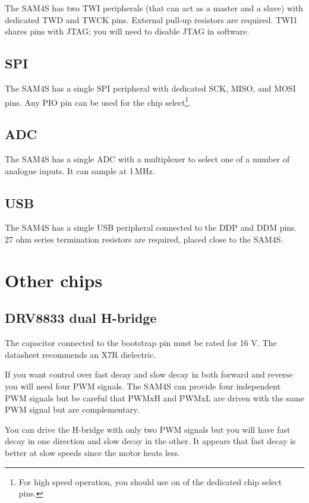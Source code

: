 The SAM4S has two TWI peripherals (that can act as a master and
a slave) with dedicated TWD and TWCK pins. External pull-up resistors
are required.  TWI1 shares pins with JTAG; you will need to disable
JTAG in software.

\subsection{SPI}\label{spi}

The SAM4S has a single SPI peripheral with dedicated SCK, MISO,
and MOSI pins. Any PIO pin can be used for the chip
select\footnote{For high speed operation, you should use on of the
  dedicated chip select pins.}.

\subsection{ADC}\label{adc}

The SAM4S has a single ADC with a multiplexer to select one of a
number of analogue inputs.  It can sample at 1\,MHz.

\subsection{USB}\label{usb}

The SAM4S has a single USB peripheral connected to the DDP and DDM
pins. 27 ohm series termination resistors are required, placed close to
the SAM4S.

\section{Other chips}\label{other-chips}

\subsection{DRV8833 dual H-bridge}\label{drv8833-dual-h-bridge}

The capacitor connected to the bootstrap pin must be rated for 16 V. The
datasheet recommends an X7R dielectric.

If you want control over fast decay and slow decay in both forward and
reverse you will need four PWM signals. The SAM4S can provide four
independent PWM signals but be careful that PWMxH and PWMxL are driven
with the same PWM signal but are complementary.

You can drive the H-bridge with only two PWM signals but you will have
fast decay in one direction and slow decay in the other. It appears that
fast decay is better at slow speeds since the motor heats less.

